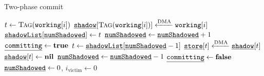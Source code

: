 \begin{algorithm}[t]
	\caption{Two-phase commit}
	\label{algo:commit}
	\scriptsize
	\begin{algorithmic}[1]
         
                \State $t \gets \Call{Tag}{\texttt{working}[i]}$
                \State $\texttt{\underline{shadow}}[\Call{Tag}{\texttt{working}[i]}] \xleftarrow{\text{DMA}} \texttt{working}[i]$
                \State $\texttt{\underline{shadowList}}[\texttt{\underline{numShadowed}}] \gets t$
                \State $\texttt{\underline{numShadowed}} \gets \texttt{\underline{numShadowed}} + 1$
            \EndFor
            \State {}
        \EndProcedure
            \State $\texttt{\underline{committing}} \gets \textbf{true}$
                \State $t \gets \texttt{\underline{shadowList}}[\texttt{\underline{numShadowed}} - 1]$
                \State $\texttt{\underline{store}}[t] \xleftarrow{\text{DMA}} \texttt{\underline{shadow}}[t]$
                \State $\texttt{\underline{shadow}}[t] \gets \textbf{nil}$ 
                \State $\texttt{\underline{numShadowed}} \gets \texttt{\underline{numShadowed}} - 1 $
            \EndWhile
            \State $\texttt{\underline{committing}} \gets \textbf{false}$
        \EndProcedure
         
             
            \EndIf 
            \State $\texttt{\underline{numShadowed}} \gets 0$, $i_\text{victim} \gets 0$
        \EndProcedure
	\end{algorithmic}
\end{algorithm}

%

